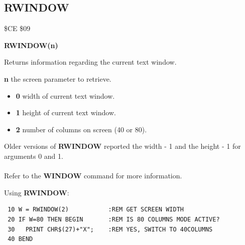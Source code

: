 \subsection{RWINDOW}
\begin{description}[leftmargin=2cm,style=nextline]
\item [Token:] \$CE \$09
\item [Format:] {\bf RWINDOW(n)}
\item [Usage:]  Returns information regarding the current text window.

                {\bf n} the screen parameter to retrieve.

                \begin{itemize}
                    \item {\bf 0} width of current text window.
                    \item {\bf 1} height of current text window.
                    \item {\bf 2} number of columns on screen (40 or 80).
                \end{itemize}

\item [Remarks:] Older versions of {\bf RWINDOW} reported
                 the width - 1 and the height - 1 for arguments 0 and 1.\\
                 \\
                 Refer to the {\bf WINDOW} command for more information.

\item [Example:] Using {\bf RWINDOW}:
\begin{tcolorbox}[colback=black,coltext=white]
\verbatimfont{\codefont}
\begin{verbatim}
 10 W = RWINDOW(2)           :REM GET SCREEN WIDTH
 20 IF W=80 THEN BEGIN       :REM IS 80 COLUMNS MODE ACTIVE?
 30   PRINT CHR$(27)+"X";    :REM YES, SWITCH TO 40COLUMNS
 40 BEND
\end{verbatim}
\end{tcolorbox}
\end{description}





\newpage
